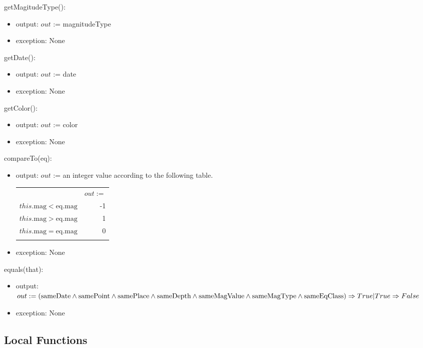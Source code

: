 \documentclass[12pt]{article}
\begin{document}
\noindent getMagitudeType():
\begin{itemize}
\item output: $out$ := magnitudeType
\item exception: None
\end{itemize}

\noindent getDate():
\begin{itemize}
\item output: $out$ := date
\item exception: None
\end{itemize}

\noindent getColor():
\begin{itemize}
\item output: $out$ := color
\item exception: None
\end{itemize}

\noindent compareTo(eq):
\begin{itemize}
\item output: $out$ := an integer value according to the following table.\\

\begin{tabular}{|p{4cm}|r|}
\hhline{~|-|}
\multicolumn{1}{r|}{} & \multicolumn{1}{l|}{$out :=$}\\
\hhline{|-|-|}
$this.\mbox{mag} < \mbox{eq.mag}$ & -1 \\
\hhline{|-|-|}
$this.\mbox{mag} > \mbox{eq.mag}$ & 1 \\
\hhline{|-|-|}
$this.\mbox{mag} = \mbox{eq.mag}$ & 0 \\
\hhline{|-|-|}
\end{tabular}

\item exception: None
\end{itemize}

\noindent equals(that):
\begin{itemize}
\item output: $out := ( \mbox{sameDate} \wedge \mbox{samePoint} \wedge \mbox{samePlace}\\
 \wedge \mbox{sameDepth} \wedge \mbox{sameMagValue} \wedge \mbox{sameMagType} \wedge \\
\mbox{sameEqClass}) \Rightarrow True | True \Rightarrow False$
\item exception: None
\end{itemize}

\newpage

\subsection*{Local Functions}
\end{document}
